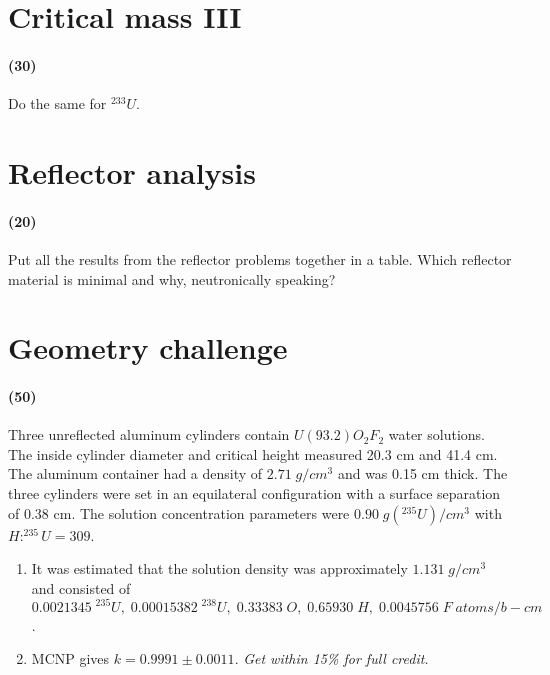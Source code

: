 \documentclass[11pt,a4paper]{article}
\begin{document}
\newpage

\section{Critical mass III}
\paragraph*{(30)}
Do the same for $^{233}U$.





\newpage

\section{Reflector analysis}
\paragraph*{(20)}
Put all the results from the reflector problems together in a table. Which reflector material is minimal and why, neutronically speaking?





\newpage

\section{Geometry challenge}
\paragraph*{(50)}
Three unreflected aluminum cylinders contain $U(93.2)O_2F_2$ water solutions. The inside cylinder diameter and critical height measured 20.3 cm and 41.4 cm. The aluminum container had a density of $2.71 \; g/cm^3$ and was 0.15 cm thick. The three cylinders were set in an equilateral configuration with a surface separation of 0.38 cm. The solution concentration parameters were $0.90 \; g(^{235}U)/cm^3$ with $H:^{235}U = 309$.

\begin{enumerate}[leftmargin=*,topsep=0pt,label=\alph*.]
    \item It was estimated that the solution density was approximately $1.131 \; g/cm^3$ and consisted of\\ $0.0021345\;^{235}U, \; 0.00015382\;^{238}U, \; 0.33383\;O, \; 0.65930\;H, \; 0.0045756\;F \; atoms/b-cm$.
    \item MCNP gives $k = 0.9991\pm0.0011$. \textit{Get within 15\% for full credit.}
\end{enumerate}    
\end{document}

